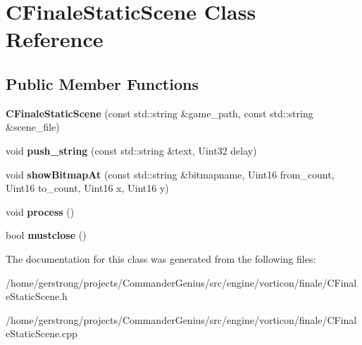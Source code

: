 \hypertarget{class_c_finale_static_scene}{
\section{CFinaleStaticScene Class Reference}
\label{class_c_finale_static_scene}
}
\subsection*{Public Member Functions}
\begin{DoxyCompactItemize}
\item 
\hypertarget{class_c_finale_static_scene_a135ae0219080d77c76233a37147df94b}{
{\bfseries CFinaleStaticScene} (const std::string \&game\_\-path, const std::string \&scene\_\-file)}
\label{class_c_finale_static_scene_a135ae0219080d77c76233a37147df94b}

\item 
\hypertarget{class_c_finale_static_scene_abc0bace0649f965127990da1db2b46e8}{
void {\bfseries push\_\-string} (const std::string \&text, Uint32 delay)}
\label{class_c_finale_static_scene_abc0bace0649f965127990da1db2b46e8}

\item 
\hypertarget{class_c_finale_static_scene_a095073262f13447aed8f6742aff0563a}{
void {\bfseries showBitmapAt} (const std::string \&bitmapname, Uint16 from\_\-count, Uint16 to\_\-count, Uint16 x, Uint16 y)}
\label{class_c_finale_static_scene_a095073262f13447aed8f6742aff0563a}

\item 
\hypertarget{class_c_finale_static_scene_a6900b19fd9dc8980bb08d7a85c6e08f2}{
void {\bfseries process} ()}
\label{class_c_finale_static_scene_a6900b19fd9dc8980bb08d7a85c6e08f2}

\item 
\hypertarget{class_c_finale_static_scene_a8e9fca43d7db13450c1fb96a11cf73e3}{
bool {\bfseries mustclose} ()}
\label{class_c_finale_static_scene_a8e9fca43d7db13450c1fb96a11cf73e3}

\end{DoxyCompactItemize}


The documentation for this class was generated from the following files:\begin{DoxyCompactItemize}
\item 
/home/gerstrong/projects/CommanderGenius/src/engine/vorticon/finale/CFinaleStaticScene.h\item 
/home/gerstrong/projects/CommanderGenius/src/engine/vorticon/finale/CFinaleStaticScene.cpp\end{DoxyCompactItemize}
